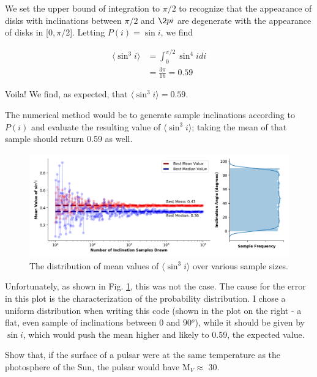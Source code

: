 \documentclass[12pt]{article}
\newenvironment{problem}[2][Problem]{\begin{trivlist}
\item[\hskip \labelsep {\bfseries #1}\hskip \labelsep {\bfseries #2.}]}{\end{trivlist}}
\newenvironment{answer}[2][Answer]{\begin{trivlist}
\item[\hskip \labelsep {\bfseries #1}\hskip \labelsep {\bfseries #2.}]}{\end{trivlist}}
\begin{document}
\begin{itemize}
\begin{answer}{5}
We set the upper bound of integration to $\pi/2$ to recognize that the appearance of disks with inclinations between $\pi/2$ and $\2pi$ are degenerate with the appearance of disks in [$0, \pi/2$]. Letting $P(i) = \sin i$, we find

\begin{align*}
  \langle\sin^3 i\rangle &= \int_0^{\pi/2} \sin^4 i di \\
  &= \frac{3 \pi}{16} = 0.59
\end{align*}

Voila! We find, as expected, that $\langle\sin^3 i\rangle = 0.59$.

The numerical method would be to generate sample inclinations according to $P(i)$ and evaluate the resulting value of $\langle\sin^3 i\rangle$; taking the mean of that sample should return 0.59 as well.

\begin{figure}[htp]
  \hspace*{\fill}%
  \includegraphics[width=\linewidth]{average_orbital_inclinations.png}\hfill%
  \hspace*{\fill}%
  \caption{The distribution of mean values of $\langle\sin^3 i\rangle$ over various sample sizes.}
  \label{fig:incls}
\end{figure}

Unfortunately, as shown in Fig. \ref{fig:incls}, this was not the case. The cause for the error in this plot is the characterization of the probability distribution. I chose a uniform distribution when writing this code (shown in the plot on the right - a flat, even sample of inclinations between 0 and 90$^o$), while it should be given by $\sin i$, which would push the mean higher and likely to 0.59, the expected value.

\end{answer}




\begin{problem}{6}
  Show that, if the surface of a pulsar were at the same temperature as the photosphere of the Sun, the pulsar would have M$_V \approx$ 30.
\end{problem}



\end{itemize}
\end{document}
